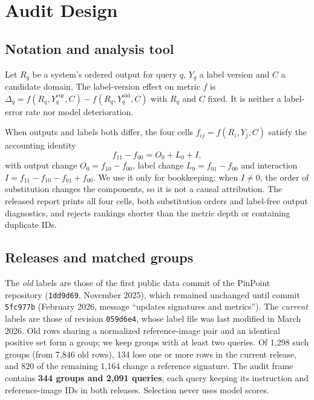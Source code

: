 \documentclass[conference]{IEEEtran}
\newcommand{\Yold}{Y^{\mathrm{old}}}
\newcommand{\Ycur}{Y^{\mathrm{cur}}}
\begin{document}
\section{Audit Design}\label{sec:method}
\subsection{Notation and analysis tool}
Let $R_q$ be a system's ordered output for query $q$, $Y_q$ a label version and $C$ a candidate domain. The label-version effect on metric $f$ is $\Delta_q=f(R_q,\Ycur_q,C)-f(R_q,\Yold_q,C)$ with $R_q$ and $C$ fixed. It is neither a label-error rate nor model deterioration.

When outputs and labels both differ, the four cells $f_{ij}=f(R_i,Y_j,C)$ satisfy the accounting identity
\begin{equation}\label{eq:four}
f_{11}-f_{00} = O_0 + L_0 + I,
\end{equation}
with output change $O_0=f_{10}-f_{00}$, label change $L_0=f_{01}-f_{00}$ and interaction $I=f_{11}-f_{10}-f_{01}+f_{00}$. We use it only for bookkeeping: when $I\neq0$, the order of substitution changes the components, so it is not a causal attribution. The released report prints all four cells, both substitution orders and label-free output diagnostics, and rejects rankings shorter than the metric depth or containing duplicate IDs.

\subsection{Releases and matched groups}\label{sec:frame}
The \emph{old} labels are those of the first public data commit of the PinPoint repository (\texttt{1dd9d69}, November 2025), which remained unchanged until commit \texttt{5fc977b} (February 2026, message ``updates signatures and metrics''). The \emph{current} labels are those of revision \texttt{059d6e4}, whose label file was last modified in March 2026. Old rows sharing a normalized reference-image pair and an identical positive set form a group; we keep groups with at least two queries. Of 1,298 such groups (from 7,846 old rows), 134 lose one or more rows in the current release, and 820 of the remaining 1,164 change a reference signature. The audit frame contains \textbf{344 groups and 2,091 queries}, each query keeping its instruction and reference-image IDs in both releases. Selection never uses model scores.
\end{document}
